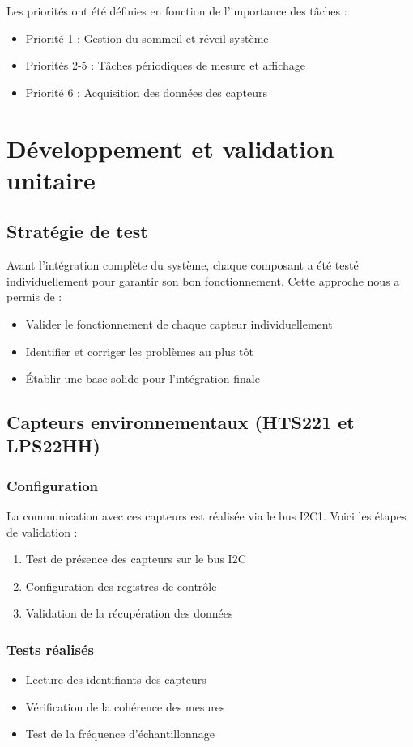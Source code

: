 \documentclass[12pt]{article}
\begin{document}
Les priorités ont été définies en fonction de l'importance des tâches :
\begin{itemize}
    \item Priorité 1 : Gestion du sommeil et réveil système
    \item Priorités 2-5 : Tâches périodiques de mesure et affichage
    \item Priorité 6 : Acquisition des données des capteurs
\end{itemize}


\section{Développement et validation unitaire}

\subsection{Stratégie de test}
Avant l'intégration complète du système, chaque composant a été testé individuellement pour garantir son bon fonctionnement. Cette approche nous a permis de :
\begin{itemize}
    \item Valider le fonctionnement de chaque capteur individuellement
    \item Identifier et corriger les problèmes au plus tôt
    \item Établir une base solide pour l'intégration finale
\end{itemize}

\subsection{Capteurs environnementaux (HTS221 et LPS22HH)}
\subsubsection{Configuration}
La communication avec ces capteurs est réalisée via le bus I2C1. Voici les étapes de validation :
\begin{enumerate}
    \item Test de présence des capteurs sur le bus I2C
    \item Configuration des registres de contrôle
    \item Validation de la récupération des données
\end{enumerate}

\subsubsection{Tests réalisés}
\begin{itemize}
    \item Lecture des identifiants des capteurs
    \item Vérification de la cohérence des mesures
    \item Test de la fréquence d'échantillonnage
\end{itemize}
\end{document}
